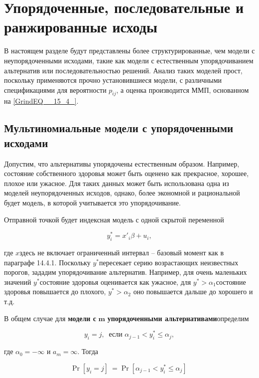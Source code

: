 \section{Упорядоченные, последовательные и ранжированные исходы}

В настоящем разделе будут представлены более структурированные, чем модели с неупорядоченными исходами, такие как модели с естественным упорядочиванием альтернатив или последовательностью решений. Анализ таких моделей прост, поскольку применяются прочно установившиеся модели, с различными спецификациями для вероятности $p_{ij}$, а оценка производится ММП, основанном на \eqref{GrindEQ__15_4_}.

\subsection{Мультиномиальные модели с упорядоченными исходами}

Допустим, что альтернативы упорядочены естественным образом. Например, состояние собственного здоровья может быть оценено как прекрасное, хорошее, плохое или ужасное. Для таких данных может быть использована одна из моделей неупорядоченных исходов, однако, более экономной и рациональной будет модель, в которой учитывается это упорядочивание.

Отправной точкой будет индексная модель с одной скрытой переменной\textbf{}

\begin{equation} \label{GrindEQ__15_47_} y^*_i=x'_i\beta +u_i, \end{equation} 

где $x$здесь не включает ограниченный интервал -- базовый момент как в параграфе 14.4.1. Поскольку $y^*$пересекает серию возрастающих неизвестных порогов, зададим упорядочивание альтернатив. Например, для очень маленьких значений $y^*$состояние здоровья оценивается как ужасное, для $y^*>{\alpha }_1$состояние здоровья повышается до плохого, $y^*>{\alpha }_2$ оно повышается дальше до хорошего и т.д.

В общем случае для \textbf{модели с }${\mathbf m}$\textbf{ упорядоченными альтернативами}определим

\begin{equation} \label{GrindEQ__15_48_} y_i=j,\ \text{ если } {\alpha }_{j-1}<y^*_i\le {\alpha }_j, \end{equation} 

где ${\alpha }_0=-\infty $ и $a_m=\infty $. Тогда

\[{\Pr  \left[y_i=j\right]\ }={\Pr  \left[{\alpha }_{j-1}<y^*_i\le {\alpha }_j\right]\ }\] 


